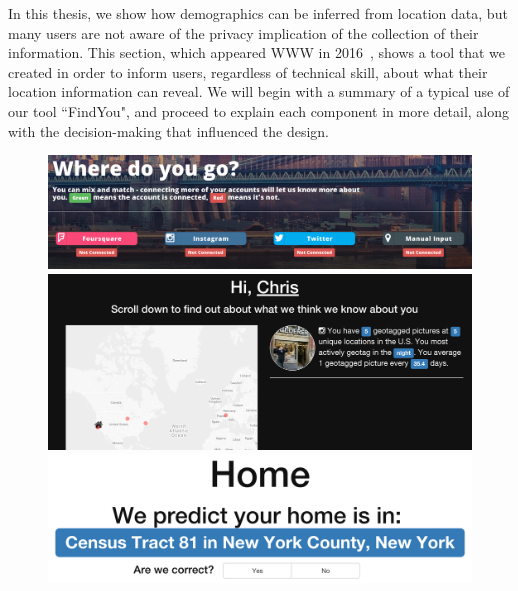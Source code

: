 In this thesis, we show how demographics can be inferred from location data, but many users are not aware of the privacy implication of the collection of their information.
This section, which appeared WWW in 2016~\cite{riederer2016findyou}, shows a tool that we created in order to inform users, regardless of technical skill, about what their location information can reveal. 
We will begin with a summary of a typical use of our tool ``FindYou", and proceed to explain each component in more detail, along with the decision-making that influenced the design. 

\begin{figure}
  \centering
  \includegraphics[width=\linewidth]{fig/findyou/connection.png}

  \includegraphics[width=\linewidth]{fig/findyou/overview.png}

  \includegraphics[width=\linewidth]{fig/findyou/home.png}


\end{figure}
